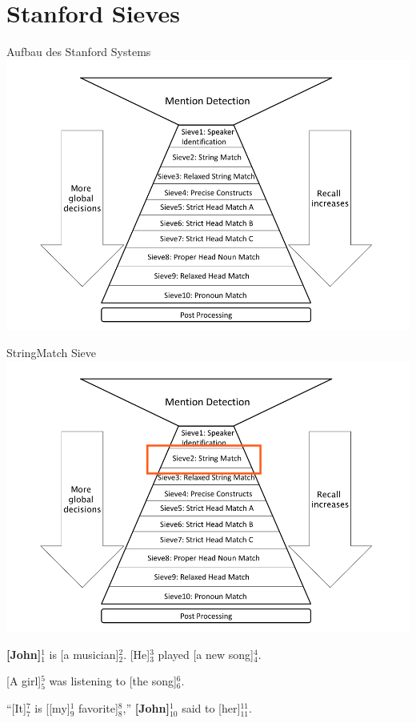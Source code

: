 \documentclass[11pt,a4paper]{beamer}
\begin{document}
\section{Stanford Sieves}
\begin{frame}{Aufbau des Stanford Systems}
\includegraphics[scale=0.29]{stanford.png}
\end{frame}

\begin{frame}{StringMatch Sieve}
\includegraphics[scale=0.2]{sieve2.png}

\textbf{[John]$^{1}_{1}$} is [a musician]$^{2}_{2}$. [He]$^{3}_{3}$ played [a new song]$^{4}_{4}$.

[A girl]$^{5}_{5}$ was listening to [the song]$^{6}_{6}$.

“[It]$^{7}_{7}$ is [[my]$^{1}_{9}$ favorite]$^{8}_{8}$,” \textbf{[John]$^{1}_{10}$} said to [her]$^{11}_{11}$.

\end{frame}
\end{document}
